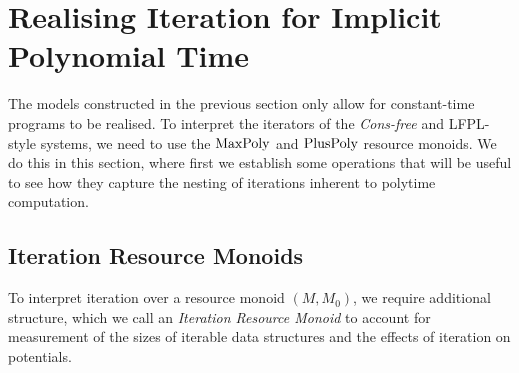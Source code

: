 \documentclass[acmsmall,screen]{acmart}
\begin{document}
\section{Realising Iteration for Implicit Polynomial Time}
\label{sec:realising-iteration}

The models constructed in the previous section only allow for
constant-time programs to be realised. To interpret the iterators of
the \emph{Cons-free} and LFPL-style systems, we need to use the
$\mathrm{MaxPoly}$ and $\mathrm{PlusPoly}$ resource monoids. We do this in this
section, where first we establish some operations that will be useful
to see how they capture the nesting of iterations inherent to polytime
computation.

\subsection{Iteration Resource Monoids}

To interpret iteration over a resource monoid $(M, M_0)$, we require
additional structure, which we call an \emph{Iteration Resource
  Monoid} to account for measurement of the sizes of iterable data
structures and the effects of iteration on potentials.
\end{document}
